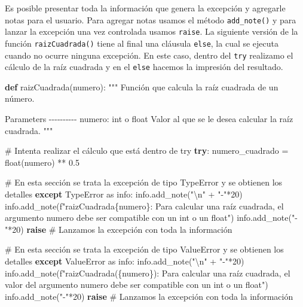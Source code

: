 \documentclass[
  spanish,
  letterpaper,
]{scrbook}
\newenvironment{Shaded}{\begin{snugshade}}{\end{snugshade}}
\newcommand{\BuiltInTok}[1]{\textcolor[rgb]{0.00,0.23,0.31}{#1}}
\newcommand{\CharTok}[1]{\textcolor[rgb]{0.13,0.47,0.30}{#1}}
\newcommand{\CommentTok}[1]{\textcolor[rgb]{0.37,0.37,0.37}{#1}}
\newcommand{\ControlFlowTok}[1]{\textcolor[rgb]{0.00,0.23,0.31}{\textbf{#1}}}
\newcommand{\DecValTok}[1]{\textcolor[rgb]{0.68,0.00,0.00}{#1}}
\newcommand{\FloatTok}[1]{\textcolor[rgb]{0.68,0.00,0.00}{#1}}
\newcommand{\ImportTok}[1]{\textcolor[rgb]{0.00,0.46,0.62}{#1}}
\newcommand{\KeywordTok}[1]{\textcolor[rgb]{0.00,0.23,0.31}{\textbf{#1}}}
\newcommand{\NormalTok}[1]{\textcolor[rgb]{0.00,0.23,0.31}{#1}}
\newcommand{\OperatorTok}[1]{\textcolor[rgb]{0.37,0.37,0.37}{#1}}
\newcommand{\PreprocessorTok}[1]{\textcolor[rgb]{0.68,0.00,0.00}{#1}}
\newcommand{\SpecialCharTok}[1]{\textcolor[rgb]{0.37,0.37,0.37}{#1}}
\newcommand{\SpecialStringTok}[1]{\textcolor[rgb]{0.13,0.47,0.30}{#1}}
\newcommand{\StringTok}[1]{\textcolor[rgb]{0.13,0.47,0.30}{#1}}
\theoremstyle{definition}
\theoremstyle{remark}
\begin{document}
Es posible presentar toda la información que genera la excepción y
agregarle notas para el usuario. Para agregar notas usamos el método
\texttt{add\_note()} y para lanzar la excepción una vez controlada
usamos \texttt{raise}. La siguiente versión de la función
\texttt{raizCuadrada()} tiene al final una cláusula \texttt{else}, la
cual se ejecuta cuando no ocurre ninguna excepción. En este caso, dentro
del \texttt{try} realizamo el cálculo de la raíz cuadrada y en el
\texttt{else} hacemos la impresión del resultado.

\begin{Shaded}
\begin{Highlighting}[]
\KeywordTok{def}\NormalTok{ raizCuadrada(numero):}
    \CommentTok{"""}
\CommentTok{    Función que calcula la raíz cuadrada de un número.}

\CommentTok{    Parameters}
\CommentTok{    {-}{-}{-}{-}{-}{-}{-}{-}{-}{-}}
\CommentTok{    numero: int o float}
\CommentTok{        Valor al que se le desea calcular la raíz cuadrada.}
\CommentTok{    }
\CommentTok{    """}
    
    \CommentTok{\# Intenta realizar el cálculo que está dentro de try}
    \ControlFlowTok{try}\NormalTok{:}
\NormalTok{        numero\_cuadrado }\OperatorTok{=} \BuiltInTok{float}\NormalTok{(numero) }\OperatorTok{**} \FloatTok{0.5}

    \CommentTok{\# En esta sección se trata la excepción de tipo TypeError y se obtienen los detalles  }
    \ControlFlowTok{except} \PreprocessorTok{TypeError} \ImportTok{as}\NormalTok{ info:}
\NormalTok{        info.add\_note(}\StringTok{"}\CharTok{\textbackslash{}n}\StringTok{"} \OperatorTok{+} \StringTok{"{-}"}\OperatorTok{*}\DecValTok{20}\NormalTok{)}
\NormalTok{        info.add\_note(}\SpecialStringTok{f"raizCuadrada}\SpecialCharTok{\{}\NormalTok{numero}\SpecialCharTok{\}}\SpecialStringTok{: Para calcular una raíz cuadrada, el argumento \textquotesingle{}numero\textquotesingle{} debe ser compatible con un int o un float"}\NormalTok{)}
\NormalTok{        info.add\_note(}\StringTok{"{-}"}\OperatorTok{*}\DecValTok{20}\NormalTok{)}
        \ControlFlowTok{raise} \CommentTok{\# Lanzamos la excepción con toda la información}

    \CommentTok{\# En esta sección se trata la excepción de tipo ValueError y se obtienen los detalles  }
    \ControlFlowTok{except} \PreprocessorTok{ValueError} \ImportTok{as}\NormalTok{ info:}
\NormalTok{        info.add\_note(}\StringTok{"}\CharTok{\textbackslash{}n}\StringTok{"} \OperatorTok{+} \StringTok{"{-}"}\OperatorTok{*}\DecValTok{20}\NormalTok{)}
\NormalTok{        info.add\_note(}\SpecialStringTok{f"raizCuadrada(\textquotesingle{}}\SpecialCharTok{\{}\NormalTok{numero}\SpecialCharTok{\}}\SpecialStringTok{\textquotesingle{}): Para calcular una raíz cuadrada, el valor del argumento \textquotesingle{}numero\textquotesingle{} debe ser compatible con un int o un float"}\NormalTok{)}
\NormalTok{        info.add\_note(}\StringTok{"{-}"}\OperatorTok{*}\DecValTok{20}\NormalTok{)}
        \ControlFlowTok{raise} \CommentTok{\# Lanzamos la excepción con toda la información}
        

\end{Highlighting}
\end{Shaded}
\end{document}
